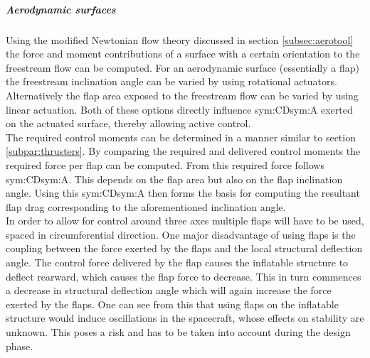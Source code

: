 \subparagraph{Aerodynamic surfaces}
Using the modified Newtonian flow theory discussed in section \ref{subsec:aerotool} the force and moment contributions of a surface with a certain orientation to the freestream flow can be computed. For an aerodynamic surface (essentially a flap) the freestream inclination angle can be varied by using rotational actuators. Alternatively the flap area exposed to the freestream flow can be varied by using linear actuation. Both of these options directly influence \gls{sym:CD}\gls{sym:A} exerted on the actuated surface, thereby allowing active control.\\
The required control moments can be determined in a manner similar to section \ref{subpar:thrusters}. By comparing the required and delivered control moments the required force per flap can be computed. From this required force follows \gls{sym:CD}\gls{sym:A}. This depends on the flap area but also on the flap inclination angle. Using this \gls{sym:CD}\gls{sym:A} then forms the basis for computing the resultant flap drag corresponding to the aforementioned inclination angle.\\
In order to allow for control around three axes multiple flaps will have to be used, spaced in circumferential direction.
One major disadvantage of using flaps is the coupling between the force exerted by the flaps and the local structural deflection angle. The control force delivered by the flap causes the inflatable structure to deflect rearward, which causes the flap force to decrease. This in turn commences a decrease in structural deflection angle which will again increase the force exerted by the flaps. One can see from this that using flaps on the inflatable structure would induce oscillations in the spacecraft, whose effects on stability are unknown. This poses a risk and has to be taken into account during the design phase.